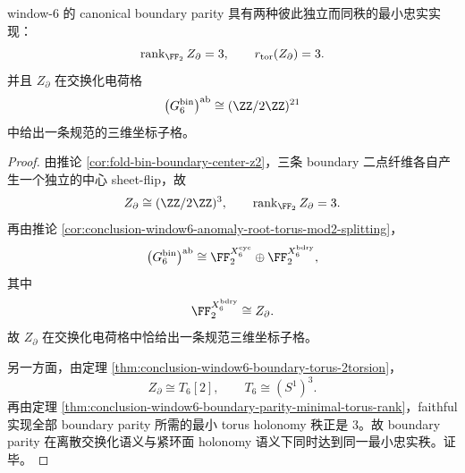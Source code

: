 \begin{theorem}\label{thm:conclusion-window6-boundary-twofold-minimal-faithful-realization}
window-\(6\) 的 canonical boundary parity 具有两种彼此独立而同秩的最小忠实实现：
\[
\operatorname{rank}_{\FF_2} Z_{\partial}=3,
\qquad
r_{\mathrm{tor}}(Z_{\partial})=3.
\]
并且 \(Z_{\partial}\) 在交换化电荷格
\[
\bigl(G_6^{\mathrm{bin}}\bigr)^{\mathrm{ab}}\cong (\ZZ/2\ZZ)^{21}
\]
中给出一条规范的三维坐标子格。
\end{theorem}
\begin{proof}
由推论 \ref{cor:fold-bin-boundary-center-z2}，三条 boundary 二点纤维各自产生一个独立的中心 sheet-flip，故
\[
Z_{\partial}\cong (\ZZ/2\ZZ)^3,
\qquad
\operatorname{rank}_{\FF_2} Z_{\partial}=3.
\]
再由推论 \ref{cor:conclusion-window6-anomaly-root-torus-mod2-splitting}，
\[
\bigl(G_6^{\mathrm{bin}}\bigr)^{\mathrm{ab}}
\cong
\FF_2^{X_6^{\mathrm{cyc}}}\oplus \FF_2^{X_6^{\mathrm{bdry}}},
\]
其中
\[
\FF_2^{X_6^{\mathrm{bdry}}}\cong Z_{\partial}.
\]
故 \(Z_{\partial}\) 在交换化电荷格中恰给出一条规范三维坐标子格。

另一方面，由定理 \ref{thm:conclusion-window6-boundary-torus-2torsion}，
\[
Z_{\partial}\cong T_6[2],
\qquad
T_6\cong (S^1)^3.
\]
再由定理 \ref{thm:conclusion-window6-boundary-parity-minimal-torus-rank}，faithful 实现全部 boundary parity 所需的最小 torus holonomy 秩正是 \(3\)。故 boundary parity 在离散交换化语义与紧环面 holonomy 语义下同时达到同一最小忠实秩。证毕。
\end{proof}

